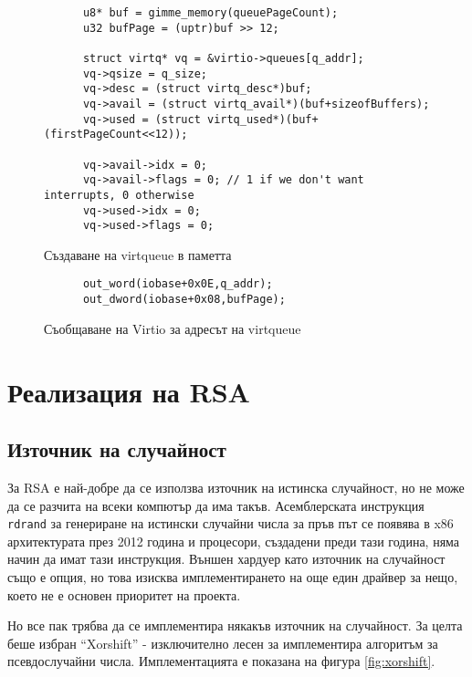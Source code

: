   \begin{figure}[htpb]
    \centering
    \begin{verbatim}
      u8* buf = gimme_memory(queuePageCount);
      u32 bufPage = (uptr)buf >> 12;

      struct virtq* vq = &virtio->queues[q_addr];
      vq->qsize = q_size;
      vq->desc = (struct virtq_desc*)buf;
      vq->avail = (struct virtq_avail*)(buf+sizeofBuffers);
      vq->used = (struct virtq_used*)(buf+(firstPageCount<<12));

      vq->avail->idx = 0;
      vq->avail->flags = 0; // 1 if we don't want interrupts, 0 otherwise
      vq->used->idx = 0;
      vq->used->flags = 0;
    \end{verbatim}
    \caption{Създаване на virtqueue в паметта}
    \label{fig:preparing-virtqueue}
  \end{figure}

  \begin{figure}[htpb]
    \centering
    \begin{verbatim}
      out_word(iobase+0x0E,q_addr);
      out_dword(iobase+0x08,bufPage);
    \end{verbatim}
    \caption{Съобщаване на Virtio за адресът на virtqueue}
    \label{fig:giving-virtqueue}
  \end{figure}

\section{Реализация на RSA}
  \subsection{Източник на случайност}
  За RSA е най-добре да се използва източник на истинска случайност, но не може да се разчита на всеки компютър да има такъв. Асемблерската инструкция {\tt rdrand} за генериране на истински случайни числа за пръв път се появява в x86 архитектурата през 2012 година и процесори, създадени преди тази година, няма начин да имат тази инструкция. Външен хардуер като източник на случайност също е опция, но това изисква имплементирането на още един драйвер за нещо, което не е основен приоритет на проекта.

  Но все пак трябва да се имплементира някакъв източник на случайност. За целта беше избран ``Xorshift'' - изключително лесен за имплементира алгоритъм за псевдослучайни числа. Имплементацията е показана на фигура \ref{fig:xorshift}.

